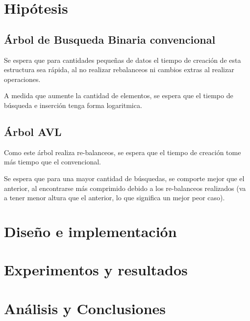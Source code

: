 \documentclass[12pt,letterpaper,hidelinks]{extarticle}
\begin{document}
\section{Hipótesis}

	\subsection{Árbol de Busqueda Binaria convencional}
		Se espera que para cantidades pequeñas de datos el tiempo de creación de esta estructura
		sea rápida, al no realizar rebalanceos ni cambios extras al realizar operaciones.

		A medida que aumente la cantidad de elementos, se espera que el tiempo de búsqueda e inserción
		tenga forma logaritmica.

	\subsection{Árbol AVL}
		Como este árbol realiza re-balanceos, se espera que el tiempo de creación tome más tiempo que el
		convencional.

		Se espera que para una mayor cantidad de búsquedas, se comporte mejor que el anterior, al encontrarse más comprimido
		 debido a los re-balanceos realizados (va a tener menor altura que el anterior, lo que significa un mejor peor caso).




\section{Diseño e implementación}

\section{Experimentos y resultados}



\section{Análisis y Conclusiones}


%
%
%
\end{document}
